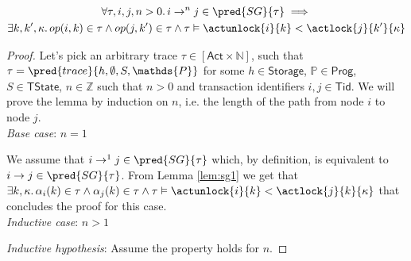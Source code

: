 \begin{lem}
	\label{lem:sg2}
	\begin{gather*}
	\forall \tau, i, j, n > 0 \ldotp i \rightarrow^n j \in \pred{SG}{\tau} \implies \\
	\exists k, k', \kappa \ldotp op(i, k) \in \tau \land op(j, k') \in \tau \land \tau \vDash \actunlock{i}{k} < \actlock{j}{k'}{\kappa}
	\end{gather*}
	
	{\parindent0pt
	\begin{proof}
	Let's pick an arbitrary trace $\tau \in [\mathsf{Act} \times \mathds{N}]$, such that $\tau = \pred{trace}{h, \emptyset, S, \mathds{P}}$ for some $h \in \mathsf{Storage}$, $\mathds{P} \in \mathsf{Prog}$, $S \in \mathsf{TState}$, $n \in \mathds{Z}$ such that $n > 0$ and transaction identifiers $i, j \in \mathsf{Tid}$. We will prove the lemma by induction on $n$, i.e. the length of the path from node $i$ to node $j$. \\
	\indline
	\textit{Base case}: $n = 1$
	
	We assume that $i \rightarrow^1 j \in \pred{SG}{\tau}$ which, by definition, is equivalent to $i \rightarrow j \in \pred{SG}{\tau}$. From Lemma \ref{lem:sg1} we get that $\exists k, \kappa \ldotp \alpha_i(k) \in \tau \land \alpha_j(k) \in \tau \land \tau \vDash \actunlock{i}{k} < \actlock{j}{k}{\kappa}$ that concludes the proof for this case. \\
	\indline
	\textit{Inductive case}: $n > 1$
	
	\textit{Inductive hypothesis}: Assume the property holds for $n$.
	

\end{proof}}
\end{lem}
